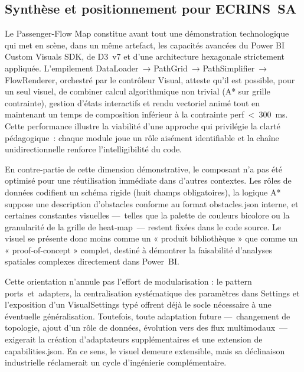 \subsection{Synthèse et positionnement pour ECRINS SA}
\label{subsec:4A-synthese}

\setlength{\parindent}{0pt}

Le Passenger-Flow Map constitue avant tout une démonstration technologique qui met en scène, dans un même artefact, les capacités avancées du Power BI Custom Visuals SDK, de D3 v7 et d’une architecture hexagonale strictement appliquée. L’empilement DataLoader → PathGrid → PathSimplifier → FlowRenderer, orchestré par le contrôleur Visual, atteste qu’il est possible, pour un seul visuel, de combiner calcul algorithmique non trivial (A* sur grille contrainte), gestion d’états interactifs et rendu vectoriel animé tout en maintenant un temps de composition inférieur à la contrainte perf < 300 ms. Cette performance illustre la viabilité d’une approche qui privilégie la clarté pédagogique : chaque module joue un rôle aisément identifiable et la chaîne unidirectionnelle renforce l’intelligibilité du code.

En contre‑partie de cette dimension démonstrative, le composant n’a pas été optimisé pour une réutilisation immédiate dans d’autres contextes. Les rôles de données codifient un schéma rigide (huit champs obligatoires), la logique A* suppose une description d’obstacles conforme au format obstacles.json interne, et certaines constantes visuelles — telles que la palette de couleurs bicolore ou la granularité de la grille de heat‑map — restent fixées dans le code source. Le visuel se présente donc moins comme un « produit bibliothèque » que comme un « proof‑of‑concept » complet, destiné à démontrer la faisabilité d’analyses spatiales complexes directement dans Power BI.

Cette orientation n’annule pas l’effort de modularisation : le pattern ports et adapters, la centralisation systématique des paramètres dans Settings et l’exposition d’un VisualSettings typé offrent déjà le socle nécessaire à une éventuelle généralisation. Toutefois, toute adaptation future — changement de topologie, ajout d’un rôle de données, évolution vers des flux multimodaux — exigerait la création d’adaptateurs supplémentaires et une extension de capabilities.json. En ce sens, le visuel demeure extensible, mais sa déclinaison industrielle réclamerait un cycle d’ingénierie complémentaire.

